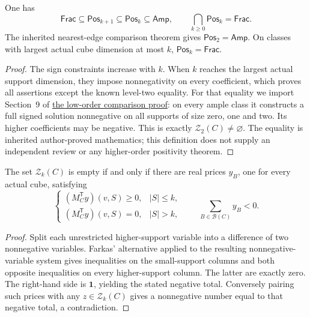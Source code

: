 \begin{proposition}
\label{prop:refinement-positivity-chain}
One has
\[
 \mathsf{Frac}\subseteq\mathsf{Pos}_{k+1}\subseteq\mathsf{Pos}_k
 \subseteq\mathsf{Amp},\qquad
 \bigcap_{k\ge0}\mathsf{Pos}_k=\mathsf{Frac}.
\]
The inherited nearest-edge comparison theorem gives
$\mathsf{Pos}_2=\mathsf{Amp}$.
On classes with largest actual cube dimension at most $k$,
$\mathsf{Pos}_k=\mathsf{Frac}$.
\end{proposition}
\begin{proof}
The sign constraints increase with $k$. When $k$ reaches the largest
actual support dimension, they impose nonnegativity on every coefficient,
which proves all assertions except the known level-two equality.
For that equality we import Section~9 of
\href{../minor-atlas/research/stationary_exclusion_attack.md}{the low-order comparison proof}:
on every ample class it constructs a full signed solution nonnegative on
all supports of size zero, one and two. Its higher coefficients may be
negative. This is exactly $\mathcal Z_2(C)\ne\varnothing$.
The equality is inherited author-proved mathematics; this definition does
not supply an independent review or any higher-order positivity theorem.
\end{proof}

\begin{proposition}
\label{prop:refinement-positivity-dual}
The set $\mathcal Z_k(C)$ is empty if and only if there are real prices
$y_B$, one for every actual cube, satisfying
\[
 \begin{cases}
 (M_C^{\mathsf T}y)(v,S)\ge0,& |S|\le k,\\
 (M_C^{\mathsf T}y)(v,S)=0,& |S|>k,
 \end{cases}
 \qquad \sum_{B\in\mathcal B(C)}y_B<0.
\]
\end{proposition}
\begin{proof}
Split each unrestricted higher-support variable into a difference of two
nonnegative variables. Farkas' alternative applied to the resulting
nonnegative-variable system gives inequalities on the small-support
columns and both opposite inequalities on every higher-support column.
The latter are exactly zero. The right-hand side is $\mathbf1$, yielding
the stated negative total. Conversely pairing such prices with any
$z\in\mathcal Z_k(C)$ gives a nonnegative number equal to that negative
total, a contradiction.
\end{proof}

